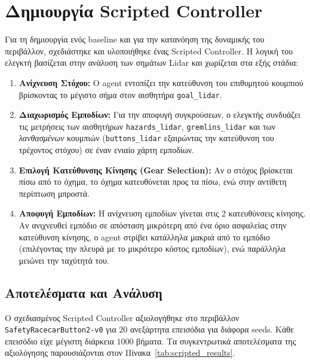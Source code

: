 \documentclass[acmsmall,screen,nonacm]{acmart}
\begin{document}
	\section{Δημιουργία Scripted Controller}
	Για τη δημιουργία ενός baseline και για την κατανόηση της δυναμικής του περιβάλλον, σχεδιάστηκε και υλοποιήθηκε ένας Scripted Controller. Η λογική του ελεγκτή βασίζεται στην ανάλυση των σημάτων Lidar και χωρίζεται στα εξής στάδια:
	\begin{enumerate}
		\item \textbf{Ανίχνευση Στόχου:} Ο agent εντοπίζει την κατεύθυνση του επιθυμητού κουμπιού βρίσκοντας το μέγιστο σήμα στον αισθητήρα \texttt{goal\_lidar}. 
		\item \textbf{Διαχωρισμός Εμποδίων:} Για την αποφυγή συγκρούσεων, ο ελεγκτής συνδυάζει τις μετρήσεις των αισθητήρων \texttt{hazards\_lidar}, \texttt{gremlins\_lidar} και των \textit{λανθασμένων} κουμπιών (\texttt{buttons\_lidar} εξαιρώντας την κατεύθυνση του τρέχοντος στόχου) σε έναν ενιαίο χάρτη εμποδίων.
		\item \textbf{Επιλογή Κατεύθυνσης Κίνησης (Gear Selection):} Αν ο στόχος βρίσκεται πίσω από το όχημα, το όχημα κατευθύνεται προς τα πίσω, ενώ στην αντίθετη περίπτωση μπροστά.
		\item \textbf{Αποφυγή Εμποδίων:} Η ανίχνευση εμποδίων γίνεται στις 2 κατευθύνσεις κίνησης. Αν ανιχνευθεί εμπόδιο σε απόσταση μικρότερη από ένα όριο ασφαλείας στην κατεύθυνση κίνησης, ο agent στρίβει κατάλληλα μακριά από το εμπόδιο (επιλέγοντας την πλευρά με το μικρότερο κόστος εμποδίων), ενώ παράλληλα μειώνει την ταχύτητά του.
	\end{enumerate}
	
	\subsection{Αποτελέσματα και Ανάλυση}
	Ο σχεδιασμένος Scripted Controller αξιολογήθηκε στο περιβάλλον \texttt{SafetyRacecarButton2-v0} για $20$ ανεξάρτητα επεισόδια για διάφορα seeds. Κάθε επεισόδιο είχε μέγιστη διάρκεια $1000$ βήματα. Τα συγκεντρωτικά αποτελέσματα της αξιολόγησης παρουσιάζονται στον Πίνακα~\ref{tab:scripted_results}.
\end{document}

